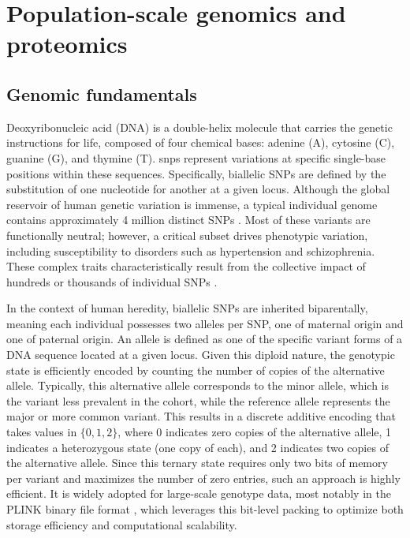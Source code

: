 \section{Population-scale genomics and proteomics}
\subsection{Genomic fundamentals}

Deoxyribonucleic acid (DNA) is a double-helix molecule that carries the genetic instructions for life, composed of four chemical bases: adenine (A), cytosine (C), guanine (G), and thymine (T). \glspl{snp} represent variations at specific single-base positions within these sequences. Specifically, biallelic SNPs are defined by the substitution of one nucleotide for another at a given locus. Although the global reservoir of human genetic variation is immense, a typical individual genome contains approximately 4 million distinct SNPs \cite{1000Genomes2015}. Most of these variants are functionally neutral; however, a critical subset drives phenotypic variation, including susceptibility to disorders such as hypertension and schizophrenia. These complex traits characteristically result from the collective impact of hundreds or thousands of individual SNPs \cite{visscher201710}.

In the context of human heredity, biallelic SNPs are inherited biparentally, meaning each individual possesses two alleles per SNP, one of maternal origin and one of paternal origin. An allele is defined as one of the specific variant forms of a DNA sequence located at a given locus. Given this diploid nature, the genotypic state is efficiently encoded by counting the number of copies of the alternative allele. Typically, this alternative allele corresponds to the minor allele, which is the variant less prevalent in the cohort, while the reference allele represents the major or more common variant. This results in a discrete additive encoding that takes values in $\{0, 1, 2\}$, where 0 indicates zero copies of the alternative allele, 1 indicates a heterozygous state (one copy of each), and 2 indicates two copies of the alternative allele.
Since this ternary state requires only two bits of memory per variant and maximizes the number of zero entries, such an approach is highly efficient. It is widely adopted for large-scale genotype data, most notably in the PLINK binary file format \cite{purcell2007plink}, which leverages this bit-level packing to optimize both storage efficiency and computational scalability.

